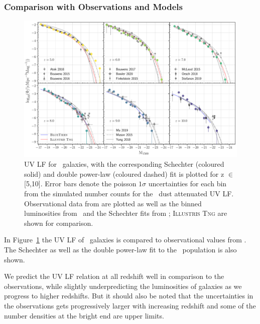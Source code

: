 \subsubsection{Comparison with Observations and Models}\label{sec: PhotProp.UVLF.Compare}
\begin{figure}
	\centering
	\includegraphics[width=\textwidth]{./figures/LF_FUV_z5_10_Observations+Models}
	\caption{UV LF for \flares\, galaxies, with the corresponding Schechter (coloured solid) and double power-law (coloured dashed) fit is plotted for z $\in$ [5,10]. Error bars denote the poisson $1\sigma$ uncertainties for each bin from the simulated number counts for the \flares\, dust attenuated UV LF. Observational data from \protect\cite{Bouwens_2015a,McLeod2015,Finkelstein2015,Bouwens_2016,Bouwens2017,Oesch_2018,Atek2018,Stefanon2019,Bowler2020} are plotted as well as the binned luminosities from \bluetides\,\protect\citep{Wilkins2017} and the Schechter fits from \protect\cite{Mason2015,ma_dust_2019, yung_semi-analytic_2019}; \textsc{Illustris Tng} \protect\citep[Model-C from][]{Vogelsberger2020} are shown for comparison.  \label{fig: UVLF Compare}} 
\end{figure}
In Figure~\ref{fig: UVLF Compare} the UV LF of \flares\, galaxies is compared to observational values from
\cite{Bouwens_2015a,McLeod2015,Finkelstein2015,Bouwens_2016,Bouwens2017,Oesch_2018,Atek2018,Stefanon2019,Bowler2020}. The Schechter as well as the double power-law fit to the \flares\, population is also shown. 

We predict the UV LF relation at all redshift well in comparison to the observations, while slightly underpredicting the luminosities of galaxies as we progress to higher redshifts. But it should also be noted that the uncertainties in the observations gets progressively larger with increasing redshift and some of the number densities at the bright end are upper limits.

